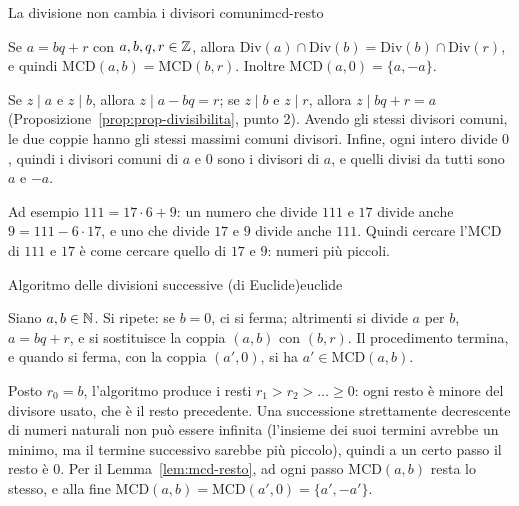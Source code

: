 \begin{concetto}
\begin{Lemma}{La divisione non cambia i divisori comuni}{mcd-resto}
    \begin{prerequisiti}
    \end{prerequisiti}
    Se $a = bq + r$ con $a, b, q, r \in \mathbb{Z}$, allora $\mathrm{Div}(a) \cap \mathrm{Div}(b) = \mathrm{Div}(b) \cap \mathrm{Div}(r)$, e quindi
    $\mathrm{MCD}(a, b) = \mathrm{MCD}(b, r)$. Inoltre $\mathrm{MCD}(a, 0) = \{a, -a\}$.
\end{Lemma}
\begin{dimostrazione}
    Se $z \mid a$ e $z \mid b$, allora $z \mid a - bq = r$; se $z \mid b$ e $z \mid r$, allora $z \mid bq + r = a$ (Proposizione~\ref{prop:prop-divisibilita},
    punto 2). Avendo gli stessi divisori comuni, le due coppie hanno gli stessi massimi comuni divisori. Infine, ogni intero divide $0$,
    quindi i divisori comuni di $a$ e $0$ sono i divisori di $a$, e quelli divisi da tutti sono $a$ e $-a$.
\end{dimostrazione}
\end{concetto}

\begin{spiegazione}
    Ad esempio $111 = 17 \cdot 6 + 9$: un numero che divide $111$ e $17$ divide anche $9 = 111 - 6 \cdot 17$, e uno che divide $17$ e $9$
    divide anche $111$. Quindi cercare l'MCD di $111$ e $17$ è come cercare quello di $17$ e $9$: numeri più piccoli.
\end{spiegazione}

\begin{concetto}
\begin{Teorema}{Algoritmo delle divisioni successive (di Euclide)}{euclide}
    \begin{prerequisiti}
    \end{prerequisiti}
    Siano $a, b \in \mathbb{N}$. Si ripete: se $b = 0$, ci si ferma; altrimenti si divide $a$ per $b$, $a = bq + r$, e si sostituisce la coppia $(a, b)$
    con $(b, r)$. Il procedimento termina, e quando si ferma, con la coppia $(a', 0)$, si ha $a' \in \mathrm{MCD}(a, b)$.
\end{Teorema}
\begin{dimostrazione}
    Posto $r_0 = b$, l'algoritmo produce i resti $r_1 > r_2 > \dots \geq 0$: ogni resto è minore del divisore usato, che è il resto precedente.
    Una successione strettamente decrescente di numeri naturali non può essere infinita (l'insieme dei suoi termini avrebbe un minimo, ma
    il termine successivo sarebbe più piccolo), quindi a un certo passo il resto è $0$. Per il Lemma~\ref{lem:mcd-resto}, ad ogni passo
    $\mathrm{MCD}(a, b)$ resta lo stesso, e alla fine $\mathrm{MCD}(a, b) = \mathrm{MCD}(a', 0) = \{a', -a'\}$.
\end{dimostrazione}
\end{concetto}


